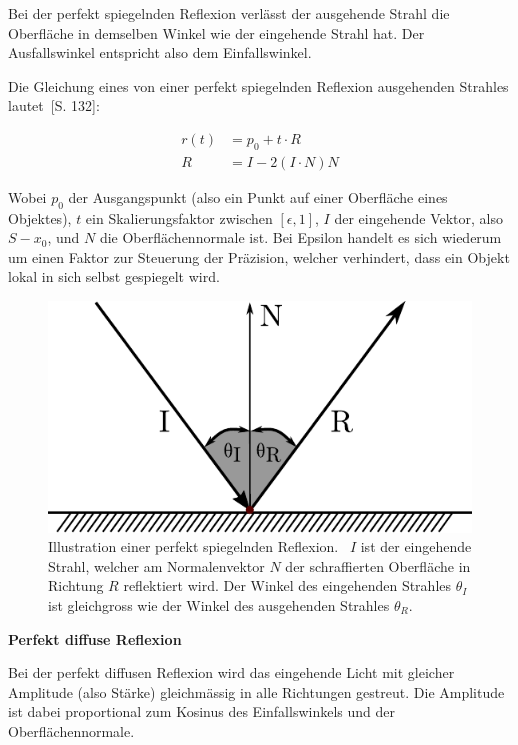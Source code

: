 Bei der perfekt spiegelnden Reflexion verlässt der ausgehende Strahl die
Oberfläche in demselben Winkel wie der eingehende Strahl hat. Der
Ausfallswinkel entspricht also dem Einfallswinkel.

Die Gleichung eines von einer perfekt spiegelnden Reflexion ausgehenden
Strahles lautet~\cite{glassner_introduction_1989}[S. 132]:

\begin{align}
    r(t) &= p_{0} + t \cdot R \\
    R &= I - 2(I \cdot N)N
\end{align}

Wobei $p_{0}$ der Ausgangspunkt (also ein Punkt auf einer Oberfläche
eines Objektes), $t$ ein Skalierungsfaktor zwischen $[\epsilon, 1]$, $I$
der eingehende Vektor, also $S - x_{0}$, und $N$ die Oberflächennormale
ist. Bei Epsilon handelt es sich wiederum um einen Faktor zur Steuerung
der Präzision, welcher verhindert, dass ein Objekt lokal in sich selbst
gespiegelt wird.

\begin{figure}[H]\label{fig:ray_tracing_specular_reflection}
    \centering
    \includegraphics{img/perfect_specular_reflection.pdf}
    \caption{Illustration einer perfekt spiegelnden
        Reflexion.~\protect\footnotemark{}
        $I$ ist der eingehende Strahl, welcher am Normalenvektor $N$ der
        schraffierten Oberfläche in Richtung $R$ reflektiert wird. Der
        Winkel des eingehenden Strahles $\theta_{I}$ ist gleichgross wie der
        Winkel des ausgehenden Strahles $\theta_{R}$.}
\end{figure}


\textbf{Perfekt diffuse Reflexion}

Bei der perfekt diffusen Reflexion wird das eingehende Licht mit
gleicher Amplitude (also Stärke) gleichmässig in alle Richtungen
gestreut. Die Amplitude ist dabei proportional zum Kosinus des
Einfallswinkels und der Oberflächennormale.

